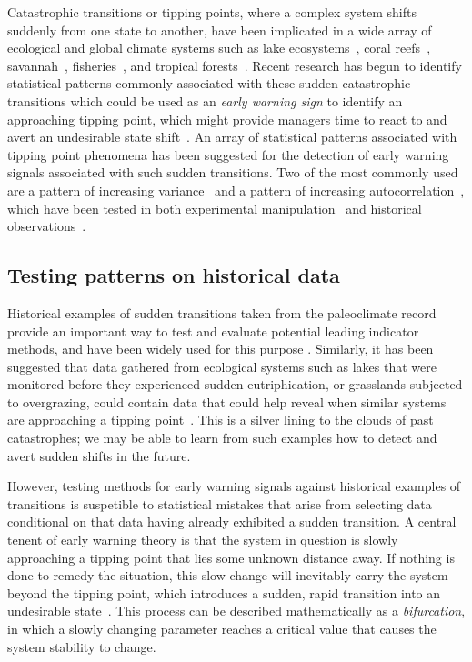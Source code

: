 \documentclass[authoryear,review,12pt]{elsarticle}
\begin{document}

Catastrophic transitions or tipping points, where a complex system
shifts suddenly from one state to another, have been implicated in
a wide array of ecological and global climate systems such as lake
ecosystems~\citep{Carpenter2011}, coral reefs~\citep{Mumby2007},
savannah~\citep{Kefi2007}, fisheries~\citep{Berkes2006}, and tropical
forests~\citep{Hirota2011}.  Recent research has begun to identify
statistical patterns commonly associated with these sudden catastrophic
transitions which could be used as an \emph{early warning sign} to
identify an approaching tipping point, which might provide managers time
to react to and avert an undesirable state shift~\citep{Scheffer2009, Lenton2011}.
An array of statistical patterns associated with tipping
point phenomena has been suggested for the detection of early warning
signals associated with such sudden transitions.  Two of the most commonly
used are a pattern of increasing variance~\citep{Carpenter2006} and a
pattern of increasing autocorrelation~\citep{vanNes2007}, which have
been tested in both experimental manipulation~\citep{Drake2010,
Carpenter2011, Veraart2011} and historical
observations~\citep{Livina2007,Dakos2008,Lenton2012,Ditlevsen2010,Guttal2008,Thompson2010}.


\subsection*{Testing patterns on historical data}

Historical examples of sudden transitions taken from the paleoclimate
record provide an important way to test and evaluate potential
leading indicator methods, and have been widely used for this purpose
\citep{Livina2007,Dakos2008,Lenton2012,Ditlevsen2010,Guttal2008,Thompson2010}.
Similarly, it has been suggested that data gathered from ecological
systems such as lakes that were monitored before they experienced sudden
eutriphication, or grasslands subjected to overgrazing, could contain
data that could help reveal when similar systems are approaching a
tipping point~\citep{Carpenter2011}.  This is a silver lining to the
clouds of past catastrophes; we may be able to learn from such examples
how to detect and avert sudden shifts in the future.

However, testing methods for early warning signals against historical
examples of transitions is suspetible to statistical mistakes that arise
from selecting data conditional on that data having already exhibited
a sudden transition.  A central tenent of early warning theory is that
the system in question is slowly approaching a tipping point that lies
some unknown distance away.  If nothing is done to remedy the situation,
this slow change will inevitably carry the system beyond the tipping
point, which introduces a sudden, rapid transition into an undesirable
state~\citep{Scheffer2009}. This process can be described mathematically
as a \emph{bifurcation}, in which a slowly changing parameter reaches
a critical value that causes the system stability to change.
\end{document}
